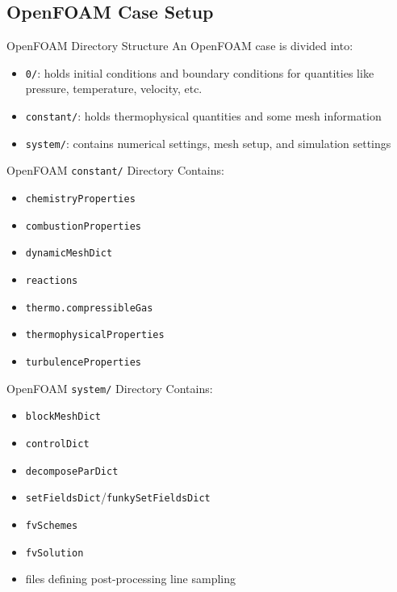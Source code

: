 \subsection{OpenFOAM Case Setup}

\begin{frame}{OpenFOAM Directory Structure}
An OpenFOAM case is divided into:
\begin{itemize}
\item \texttt{0/}: holds initial conditions and boundary conditions for quantities like pressure, temperature, velocity, etc. 
\item \texttt{constant/}: holds thermophysical quantities and some mesh information 
\item \texttt{system/}: contains numerical settings, mesh setup, and simulation settings
\end{itemize}
\end{frame}

\begin{frame}{OpenFOAM \texttt{constant/} Directory}
Contains:
\begin{itemize}
\item \texttt{chemistryProperties}
\item \texttt{combustionProperties}
\item \texttt{dynamicMeshDict}
\item \texttt{reactions}
\item \texttt{thermo.compressibleGas}
\item \texttt{thermophysicalProperties}
\item \texttt{turbulenceProperties}
\end{itemize}
\end{frame}

\begin{frame}{OpenFOAM \texttt{system/} Directory}
Contains:
\begin{itemize}
\item \texttt{blockMeshDict}
\item \texttt{controlDict}
\item \texttt{decomposeParDict}
\item \texttt{setFieldsDict}/\texttt{funkySetFieldsDict}
\item \texttt{fvSchemes}
\item \texttt{fvSolution}
\item files defining post-processing line sampling
\end{itemize}
\end{frame}

